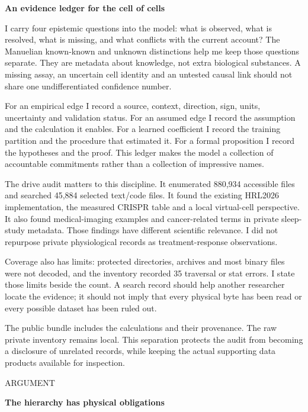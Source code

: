 \documentclass[10pt]{article}
\begin{document}
{\LARGE\bfseries\color{ink}An evidence ledger for the cell of cells}\par\vspace{5pt}
I carry four epistemic questions into the model: what is observed, what is resolved, what is missing, and what conflicts with the current account? The Manuelian known-known and unknown distinctions help me keep those questions separate. They are metadata about knowledge, not extra biological substances. A missing assay, an uncertain cell identity and an untested causal link should not share one undifferentiated confidence number.\par
For an empirical edge I record a source, context, direction, sign, units, uncertainty and validation status. For an assumed edge I record the assumption and the calculation it enables. For a learned coefficient I record the training partition and the procedure that estimated it. For a formal proposition I record the hypotheses and the proof. This ledger makes the model a collection of accountable commitments rather than a collection of impressive names.\par
The drive audit matters to this discipline. It enumerated 880,934 accessible files and searched 45,884 selected text/code files. It found the existing HRL2026 implementation, the measured CRISPR table and a local virtual-cell perspective. It also found medical-imaging examples and cancer-related terms in private sleep-study metadata. Those findings have different scientific relevance. I did not repurpose private physiological records as treatment-response observations.\par
Coverage also has limits: protected directories, archives and most binary files were not decoded, and the inventory recorded 35 traversal or stat errors. I state those limits beside the count. A search record should help another researcher locate the evidence; it should not imply that every physical byte has been read or every possible dataset has been ruled out.\par
The public bundle includes the calculations and their provenance. The raw private inventory remains local. This separation protects the audit from becoming a disclosure of unrelated records, while keeping the actual supporting data products available for inspection.\par
\clearpage
\hypertarget{p6}{}
{\small\color{accent}\MakeUppercase{Argument}}\par
{\LARGE\bfseries\color{ink}The hierarchy has physical obligations}\par\vspace{5pt}
\end{document}
